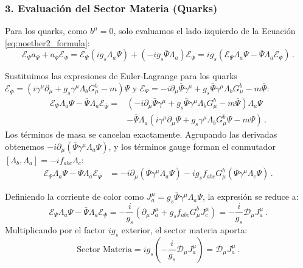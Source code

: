 \subsubsection*{3. Evaluación del Sector Materia (Quarks)}
Para los quarks, como $b^\mu = 0$, solo evaluamos el lado izquierdo de la Ecuación \eqref{eq:noether2_formula}:
\begin{equation}
    \mathcal{E}_\Psi a_\Psi + a_{\bar{\Psi}} \mathcal{E}_{\bar{\Psi}} = \mathcal{E}_\Psi (i g_s \Lambda_a \Psi) + (-i g_s \bar{\Psi} \Lambda_a) \mathcal{E}_{\bar{\Psi}} = i g_s \left( \mathcal{E}_\Psi \Lambda_a \Psi - \bar{\Psi} \Lambda_a \mathcal{E}_{\bar{\Psi}} \right) \, .
\end{equation}

Sustituimos las expresiones de Euler-Lagrange para los quarks $\mathcal{E}_{\bar{\Psi}} = (i\gamma^\mu \partial_\mu + g_s \gamma^\mu \Lambda_b G_\mu^b - m)\Psi$ y $\mathcal{E}_\Psi = -i \partial_\mu \bar{\Psi} \gamma^\mu + g_s \bar{\Psi} \gamma^\mu \Lambda_b G_\mu^b - m \bar{\Psi}$:
\begin{align}
    \mathcal{E}_\Psi \Lambda_a \Psi - \bar{\Psi} \Lambda_a \mathcal{E}_{\bar{\Psi}} =& \left( -i \partial_\mu \bar{\Psi} \gamma^\mu + g_s \bar{\Psi} \gamma^\mu \Lambda_b G_\mu^b - m \bar{\Psi} \right) \Lambda_a \Psi \nonumber \\
    &- \bar{\Psi} \Lambda_a \left( i\gamma^\mu \partial_\mu \Psi + g_s \gamma^\mu \Lambda_b G_\mu^b \Psi - m\Psi \right) \, .
\end{align}
Los términos de masa se cancelan exactamente. Agrupando las derivadas obtenemos $-i\partial_\mu(\bar{\Psi}\gamma^\mu\Lambda_a \Psi)$, y los términos gauge forman el conmutador $[\Lambda_b, \Lambda_a] = -i f_{abc} \Lambda_c$:
\begin{align}
    \mathcal{E}_\Psi \Lambda_a \Psi - \bar{\Psi} \Lambda_a \mathcal{E}_{\bar{\Psi}} &= -i \partial_\mu (\bar{\Psi} \gamma^\mu \Lambda_a \Psi) - i g_s f_{abc} G_\mu^b (\bar{\Psi} \gamma^\mu \Lambda_c \Psi) \, .
\end{align}

Definiendo la corriente de color como $J^\mu_a = g_s \bar{\Psi} \gamma^\mu \Lambda_a \Psi$, la expresión se reduce a:
\begin{equation}
    \mathcal{E}_\Psi \Lambda_a \Psi - \bar{\Psi} \Lambda_a \mathcal{E}_{\bar{\Psi}} = -\frac{i}{g_s} \left( \partial_\mu J^\mu_a + g_s f_{abc} G^b_\mu J^\mu_c \right) = -\frac{i}{g_s} \mathcal{D}_\mu J^\mu_a \, .
\end{equation}
Multiplicando por el factor $i g_s$ exterior, el sector materia aporta:
\begin{equation}
    \text{Sector Materia} = i g_s \left( -\frac{i}{g_s} \mathcal{D}_\mu J^\mu_a \right) = \mathcal{D}_\mu J^\mu_a \, .
    \label{eq:sector_materia}
\end{equation}

